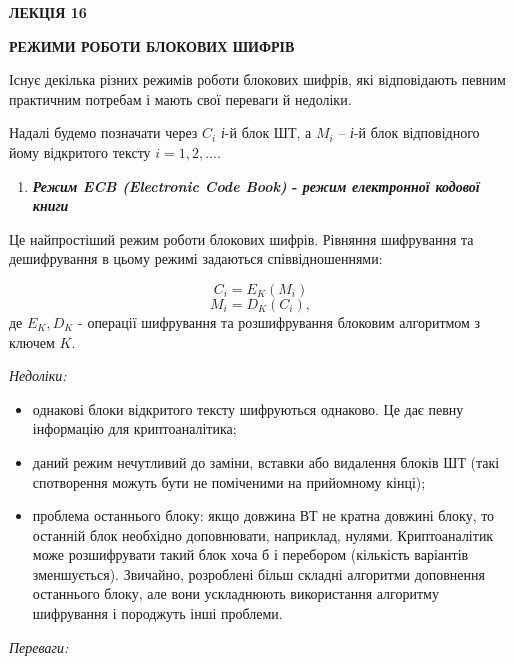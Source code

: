 \documentclass[a4paper]{article}
\newcommand\liststyleWWviiiNumxxi{%
\renewcommand\theenumi{\arabic{enumi}}
\renewcommand\theenumii{\arabic{enumii}}
\renewcommand\theenumiii{\arabic{enumiii}}
\renewcommand\theenumiv{\arabic{enumiv}}
\renewcommand\labelenumi{\theenumi.}
\renewcommand\labelenumii{\theenumii.}
\renewcommand\labelenumiii{\theenumiii.}
\renewcommand\labelenumiv{\theenumiv.}
}
\newcommand\liststyleWWviiiNumxv{%
\renewcommand\labelitemi{\textlatin{[F0B7?]}}
\renewcommand\labelitemii{o}
\renewcommand\labelitemiii{\textlatin{[F0A7?]}}
\renewcommand\labelitemiv{\textlatin{[F0B7?]}}
}
\newcounter{}
\begin{document}
\bigskip


\bigskip


\bigskip

{\bfseries
ЛЕКЦІЯ  16}


\bigskip

{\centering\bfseries
РЕЖИМИ РОБОТИ БЛОКОВИХ ШИФРІВ
\par}


\bigskip


\bigskip

Існує декілька різних режимів роботи блокових шифрів, які відповідають певним
практичним потребам і мають свої переваги й недоліки.

Надалі будемо позначати через  ${C_{{i}}}$ \textit{і}{}-й блок ШТ, а 
${M_{{i}}}$ – \textit{і}{}-й блок відповідного йому відкритого тексту 
${i=1,2,\text{.}\text{.}\text{.}}$.


\bigskip


\bigskip

\liststyleWWviiiNumxxi
\begin{enumerate}
\item {\centering\bfseries
\textit{Режим }\textit{ECB (Electronic Code Book) }{}- \textit{режим електронної
кодової книги}
\par}
\end{enumerate}

\bigskip

Це найпростіший режим роботи блокових шифрів. Рівняння шифрування та
дешифрування в цьому режимі  задаються співвідношеннями:

\begin{equation*}
{C_{{i}}=E_{{K}}(M_{{i}})}
\end{equation*}
\begin{equation*}
{M_{{i}}=D_{{K}}(C_{{i}}),}
\end{equation*}
де  ${E_{{K}},D_{{K}}}$ - операції шифрування та розшифрування блоковим
алгоритмом з ключем  ${K}$.

{\itshape
Недоліки:}

\liststyleWWviiiNumxv
\begin{itemize}
\item однакові блоки відкритого тексту шифруються однаково. Це дає певну
інформацію для криптоаналітика;
\item даний режим нечутливий до заміни, вставки або видалення блоків ШТ (такі
спотворення можуть бути не поміченими на прийомному кінці);
\item проблема останнього блоку: якщо довжина ВТ не кратна довжині блоку, то
останній блок необхідно доповнювати, наприклад, нулями. Криптоаналітик може
розшифрувати такий блок хоча б і перебором (кількість варіантів зменшується).
Звичайно, розроблені більш складні алгоритми доповнення останнього блоку, але
вони ускладнюють використання алгоритму шифрування і породжуть інші проблеми.
\end{itemize}
{\itshape
Переваги:}
\end{document}
